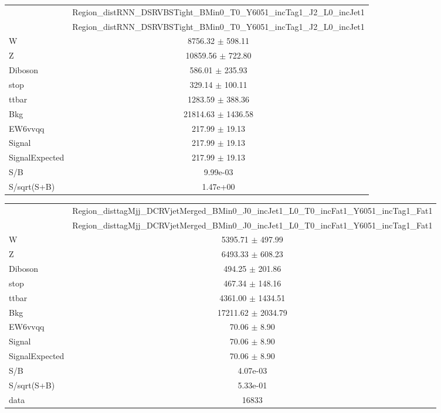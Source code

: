 \documentclass{article}
\begin{document}
\begin{table}
\centering
\small
\begin{tabular}{l|c|}
\cline{2-2}
 & \multicolumn{1}{c|}{Region\_distRNN\_DSRVBSTight\_BMin0\_T0\_Y6051\_incTag1\_J2\_L0\_incJet1}\\
\cline{2-2}
 & \multicolumn{1}{c|}{Region\_distRNN\_DSRVBSTight\_BMin0\_T0\_Y6051\_incTag1\_J2\_L0\_incJet1}\\ \hline
W & 8756.32 $\pm$ 598.11\\
Z & 10859.56 $\pm$ 722.80\\
Diboson & 586.01 $\pm$ 235.93\\
stop & 329.14 $\pm$ 100.11\\
ttbar & 1283.59 $\pm$ 388.36\\
\hline
Bkg & 21814.63 $\pm$ 1436.58\\
\hline
EW6vvqq & 217.99 $\pm$ 19.13\\
\hline
Signal & 217.99 $\pm$ 19.13\\
SignalExpected & 217.99 $\pm$ 19.13\\
\hline
S/B & 9.99e-03\\
S/sqrt(S+B) & 1.47e+00\\
\end{tabular}
\end{table}


\begin{table}
\centering
\small
\begin{tabular}{l|c|}
\cline{2-2}
 & \multicolumn{1}{c|}{Region\_disttagMjj\_DCRVjetMerged\_BMin0\_J0\_incJet1\_L0\_T0\_incFat1\_Y6051\_incTag1\_Fat1}\\
\cline{2-2}
 & \multicolumn{1}{c|}{Region\_disttagMjj\_DCRVjetMerged\_BMin0\_J0\_incJet1\_L0\_T0\_incFat1\_Y6051\_incTag1\_Fat1}\\ \hline
W & 5395.71 $\pm$ 497.99\\
Z & 6493.33 $\pm$ 608.23\\
Diboson & 494.25 $\pm$ 201.86\\
stop & 467.34 $\pm$ 148.16\\
ttbar & 4361.00 $\pm$ 1434.51\\
\hline
Bkg & 17211.62 $\pm$ 2034.79\\
\hline
EW6vvqq & 70.06 $\pm$ 8.90\\
\hline
Signal & 70.06 $\pm$ 8.90\\
SignalExpected & 70.06 $\pm$ 8.90\\
\hline
S/B & 4.07e-03\\
S/sqrt(S+B) & 5.33e-01\\
\hline
data & 16833\\ \hline
\end{tabular}
\end{table}
\end{document}
